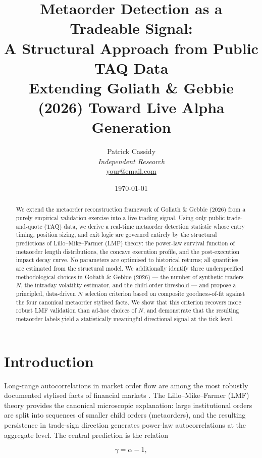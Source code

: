\documentclass[12pt,a4paper]{article}
\title{
  \textbf{Metaorder Detection as a Tradeable Signal: \\
  A Structural Approach from Public TAQ Data} \\[0.5em]
  \large Extending Goliath \& Gebbie (2026) Toward Live Alpha Generation
}
\author{
  Patrick Cassidy \\
  \textit{Independent Research} \\
  \href{mailto:your@email.com}{your@email.com}
}
\date{\today}
\begin{document}
\maketitle

\begin{abstract}
We extend the metaorder reconstruction framework of Goliath \& Gebbie (2026)
from a purely empirical validation exercise into a live trading signal. Using
only public trade-and-quote (TAQ) data, we derive a real-time metaorder
detection statistic whose entry timing, position sizing, and exit logic are
governed entirely by the structural predictions of Lillo--Mike--Farmer (LMF)
theory: the power-law survival function of metaorder length distributions, the
concave execution profile, and the post-execution impact decay curve. No
parameters are optimised to historical returns; all quantities are estimated
from the structural model. We additionally identify three underspecified
methodological choices in Goliath \& Gebbie (2026) --- the number of synthetic
traders $N$, the intraday volatility estimator, and the child-order threshold
--- and propose a principled, data-driven $N$ selection criterion based on
composite goodness-of-fit against the four canonical metaorder stylised facts.
We show that this criterion recovers more robust LMF validation than ad-hoc
choices of $N$, and demonstrate that the resulting metaorder labels yield a
statistically meaningful directional signal at the tick level.
\end{abstract}

\tableofcontents
\newpage

\section{Introduction}
\label{sec:intro}

Long-range autocorrelations in market order flow are among the most robustly
documented stylised facts of financial markets \citep{lillo2004}. The
Lillo--Mike--Farmer (LMF) theory \citep{lillo2005} provides the canonical
microscopic explanation: large institutional orders are split into sequences of
smaller child orders (metaorders), and the resulting persistence in trade-sign
direction generates power-law autocorrelations at the aggregate level. The
central prediction is the relation

\begin{equation}
  \gamma = \alpha - 1,
  \label{eq:lmf}
\end{equation}
\end{document}
